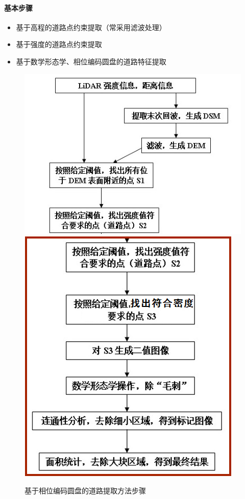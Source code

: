 \paragraph{基本步骤}
\begin{itemize}
	\item 基于高程的道路点约束提取（常采用滤波处理）
	\item 基于强度的道路点约束提取
	\item 基于数学形态学、相位编码圆盘的道路特征提取
\end{itemize}
\begin{figure}[htbp]
	\centering
	\includegraphics[width=0.3\linewidth,angle=90]{figure/Chapter6/相位编码圆盘步骤1}
	\includegraphics[width=0.3\linewidth,angle=90]{figure/Chapter6/相位编码圆盘步骤2}
	\caption{基于相位编码圆盘的道路提取方法步骤}
	\label{fig:基于相位编码圆盘的道路提取方法步骤}
\end{figure}


